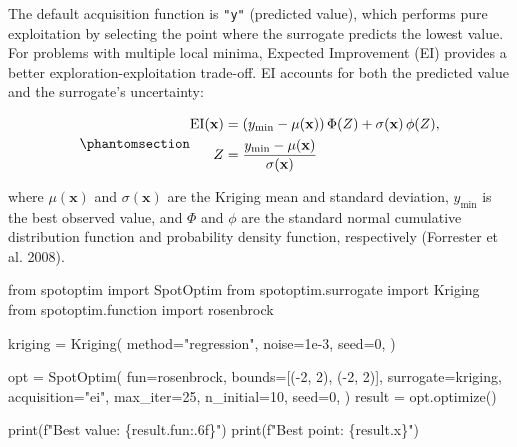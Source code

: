 \documentclass[
  twocolumn]{article}
\newenvironment{Shaded}{\begin{snugshade}}{\end{snugshade}}
\newcommand{\BuiltInTok}[1]{\textcolor[rgb]{0.00,0.23,0.31}{#1}}
\newcommand{\DecValTok}[1]{\textcolor[rgb]{0.68,0.00,0.00}{#1}}
\newcommand{\FloatTok}[1]{\textcolor[rgb]{0.68,0.00,0.00}{#1}}
\newcommand{\ImportTok}[1]{\textcolor[rgb]{0.00,0.46,0.62}{#1}}
\newcommand{\NormalTok}[1]{\textcolor[rgb]{0.00,0.23,0.31}{#1}}
\newcommand{\OperatorTok}[1]{\textcolor[rgb]{0.37,0.37,0.37}{#1}}
\newcommand{\SpecialCharTok}[1]{\textcolor[rgb]{0.37,0.37,0.37}{#1}}
\newcommand{\SpecialStringTok}[1]{\textcolor[rgb]{0.13,0.47,0.30}{#1}}
\newcommand{\StringTok}[1]{\textcolor[rgb]{0.13,0.47,0.30}{#1}}
\begin{document}
The default acquisition function is \texttt{"y"} (predicted value),
which performs pure exploitation by selecting the point where the
surrogate predicts the lowest value. For problems with multiple local
minima, Expected Improvement (EI) provides a better
exploration-exploitation trade-off. EI accounts for both the predicted
value and the surrogate's uncertainty:

\begin{equation}\protect\phantomsection\label{eq-ei}{
\begin{aligned}
\text{EI}(\mathbf{x}) &= (y_{\min} - \mu(\mathbf{x})) \, \Phi(Z) + \sigma(\mathbf{x}) \, \phi(Z), \\
Z &= \frac{y_{\min} - \mu(\mathbf{x})}{\sigma(\mathbf{x})}
\end{aligned}
}\end{equation}

where \(\mu(\mathbf{x})\) and \(\sigma(\mathbf{x})\) are the Kriging
mean and standard deviation, \(y_{\min}\) is the best observed value,
and \(\Phi\) and \(\phi\) are the standard normal cumulative
distribution function and probability density function, respectively
(Forrester et al. 2008).

\begin{Shaded}
\begin{Highlighting}[]
\ImportTok{from}\NormalTok{ spotoptim }\ImportTok{import}\NormalTok{ SpotOptim}
\ImportTok{from}\NormalTok{ spotoptim.surrogate }\ImportTok{import}\NormalTok{ Kriging}
\ImportTok{from}\NormalTok{ spotoptim.function }\ImportTok{import}\NormalTok{ rosenbrock}

\NormalTok{kriging }\OperatorTok{=}\NormalTok{ Kriging(}
\NormalTok{    method}\OperatorTok{=}\StringTok{"regression"}\NormalTok{,}
\NormalTok{    noise}\OperatorTok{=}\FloatTok{1e{-}3}\NormalTok{, seed}\OperatorTok{=}\DecValTok{0}\NormalTok{,}
\NormalTok{)}

\NormalTok{opt }\OperatorTok{=}\NormalTok{ SpotOptim(}
\NormalTok{    fun}\OperatorTok{=}\NormalTok{rosenbrock,}
\NormalTok{    bounds}\OperatorTok{=}\NormalTok{[(}\OperatorTok{{-}}\DecValTok{2}\NormalTok{, }\DecValTok{2}\NormalTok{), (}\OperatorTok{{-}}\DecValTok{2}\NormalTok{, }\DecValTok{2}\NormalTok{)],}
\NormalTok{    surrogate}\OperatorTok{=}\NormalTok{kriging,}
\NormalTok{    acquisition}\OperatorTok{=}\StringTok{"ei"}\NormalTok{,}
\NormalTok{    max\_iter}\OperatorTok{=}\DecValTok{25}\NormalTok{,}
\NormalTok{    n\_initial}\OperatorTok{=}\DecValTok{10}\NormalTok{,}
\NormalTok{    seed}\OperatorTok{=}\DecValTok{0}\NormalTok{,}
\NormalTok{)}
\NormalTok{result }\OperatorTok{=}\NormalTok{ opt.optimize()}

\BuiltInTok{print}\NormalTok{(}\SpecialStringTok{f"Best value: }\SpecialCharTok{\{}\NormalTok{result}\SpecialCharTok{.}\NormalTok{fun}\SpecialCharTok{:.6f\}}\SpecialStringTok{"}\NormalTok{)}
\BuiltInTok{print}\NormalTok{(}\SpecialStringTok{f"Best point: }\SpecialCharTok{\{}\NormalTok{result}\SpecialCharTok{.}\NormalTok{x}\SpecialCharTok{\}}\SpecialStringTok{"}\NormalTok{)}
\end{Highlighting}
\end{Shaded}
\end{document}
